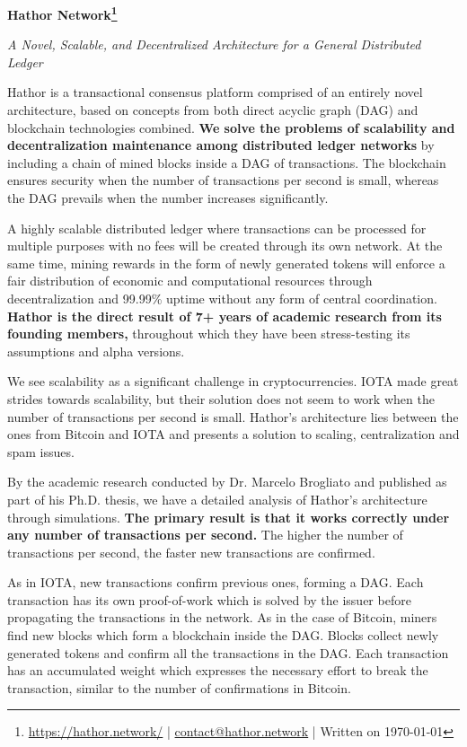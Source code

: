 \documentclass[12pt, a4paper]{article}
\begin{document}
\large
\noindent \textbf{Hathor Network\footnote{\url{https://hathor.network/} | \href{contact@hathor.network}{contact@hathor.network} | Written on \today}}

\normalsize
\noindent \emph{A Novel, Scalable, and Decentralized Architecture for a General Distributed Ledger}

\vspace{1em}

Hathor is a transactional consensus platform comprised of an entirely novel architecture, based on concepts from both direct acyclic graph (DAG) and blockchain technologies combined. \textbf{We solve the problems of scalability and decentralization maintenance among distributed ledger networks} by including a chain of mined blocks inside a DAG of transactions. The blockchain ensures security when the number of transactions per second is small, whereas the DAG prevails when the number increases significantly.

A highly scalable distributed ledger where transactions can be processed for multiple purposes with no fees will be created through its own network. At the same time, mining rewards in the form of newly generated tokens will enforce a fair distribution of economic and computational resources through decentralization and 99.99\% uptime without any form of central coordination. \textbf{Hathor is the direct result of 7+ years of academic research from its founding members,} throughout which they have been stress-testing its assumptions and alpha versions.

We see scalability as a significant challenge in cryptocurrencies. IOTA made great strides towards scalability, but their solution does not seem to work when the number of transactions per second is small. Hathor’s architecture lies between the ones from Bitcoin and IOTA and presents a solution to scaling, centralization and spam issues.

By the academic research conducted by Dr. Marcelo Brogliato and published as part of his Ph.D. thesis, we have a detailed analysis of Hathor's architecture through simulations. \textbf{The primary result is that it works correctly under any number of transactions per second.} The higher the number of transactions per second, the faster new transactions are confirmed.

As in IOTA, new transactions confirm previous ones, forming a DAG. Each transaction has its own proof-of-work which is solved by the issuer before propagating the transactions in the network. As in the case of Bitcoin, miners find new blocks which form a blockchain inside the DAG. Blocks collect newly generated tokens and confirm all the transactions in the DAG. Each transaction has an accumulated weight which expresses the necessary effort to break the transaction, similar to the number of confirmations in Bitcoin.
\end{document}
